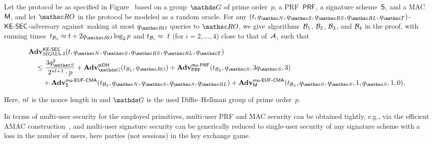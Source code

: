 \begin{theorem}
	\label{thm:SIGMAI}
	Let the \SIGMAI protocol be as specified in Figure~\fullelse{\ref{fig:sigma-formal}}{\ref{fig:sigma-protocol}} based on a group~$\group$ of prime order~$p$, a PRF~$\mathsf{PRF}$, a signature scheme~$\mathsf{S}$, and a MAC~$\mathsf{M}$, and let $\RO$ in the protocol be modeled as a random oracle.
	For any $(t\cab \qNewUser\cab \qSend\cab \qRevSessionKey\cab \qRevLongTermKey\cab \qTest)$-$\mathsf{KE{\text{\normalfont-}}SEC}$-adversary against~\SIGMAI making at most $\qRO$ queries to $\RO$,
	we give algorithms~$\mathcal{B}_1$, $\mathcal{B}_2$, $\mathcal{B}_3$, and $\mathcal{B}_4$ in the proof,
	with running times~$t_{\advB_1} \approx t + 2\qRO \log_2 p$ and $t_{\mathcal{B}_i}\approx~t$ (for $i = 2,\dots,4$) close to that of~$\mathcal{A}$,
	such that
	\begin{collectinmacro}{\SIGMABound}{}{} %
	\begin{align*}
		\Adv&^{\KESEC}_{\mSIGMAI}(t, \qNewUser, \qSend, \qRevSessionKey, \qRevLongTermKey, \qTest)\\
			\leq
			&~\frac{3\qSend^2}{2^{\nl+1}\cdot p}								%
			+ \Adv^{\strongDH}_{\group}(t_{\advB_1}, \qRO)							%
			+ \Adv^{\muPRFSEC}_{\PRF}(t_{\advB_2}, \qSend, 3\qSend,3) \\					%
			&+ \Adv^{\muEUFCMA}_{\SIGScheme}(t_{\advB_3}, \qNewUser, \qSend, \qSend, \qRevLongTermKey)	%
			+ \Adv^{\muEUFCMA}_{\MACScheme}(t_{\advB_4}, \qSend, \qSend,1, \qSend,1, 0).			%
	\end{align*}
	\end{collectinmacro}
	\SIGMABound
	Here,
	$nl$ is the nonce length in \SIGMAI
	and $\group$ is the used Diffie--Hellman group of prime order~$p$.
\end{theorem}

In terms of multi-user security for the employed primitives,
multi-user PRF and MAC security can be obtained tightly, e.g., via the efficient AMAC construction~\cite{EC:BelBerTes16},
and multi-user signature security can be generically reduced to single-user security of any signature scheme with a loss in the number of users, here parties (not sessions) in the key exchange game.

\iffull

